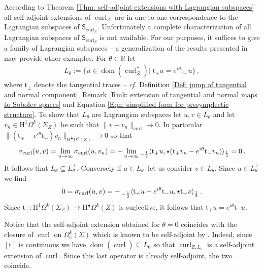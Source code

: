 \begin{Example}
	According to Theorem \ref{Thm: self-adjoint extensions with Lagrangian subspaces} all self-adjoint extensions of $\operatorname{curl}_Z$ are in one-to-one correspondence to the Lagrangian subspaces of $\mathsf{S}_{\operatorname{curl}_Z}$.
	Unfortunately a complete characterization of all Lagrangian subspaces of $\mathsf{S}_{\operatorname{curl}_Z}$ is not available.
	For our purposes, it suffices to give a family of Lagrangian subspaces -- a generalization of the results presented in \parencite{Hiptmair-Kotiuga-Tordeux-12} may provide other examples.
	For $\theta\in\mathbb{R}$ let
	\begin{align}
		L_{\theta}:=\lbrace
		u\in\operatorname{dom}(\operatorname{curl}_Z^*)|\;\mathrm{t}_+u=e^{i\theta}\mathrm{t}_-u\rbrace\,,
	\end{align}
	where $\mathrm{t}_\pm$ denote the tangential traces -- \textit{cf.} Definition \ref{Def: jump of tangential and normal component}, Remark \ref{Rmk: extension of tangential and normal maps to Sobolev spaces} and Equation \eqref{Eqn: simplified form for presymplectic structure}.
	To show that $L_\theta$ are Lagrangian subspaces let $u,v\in L_\theta$ and let $v_n\in\mathrm{H}^1\Omega^k(\Sigma_Z)$ be such that $\|v-v_n\|_{\operatorname{curl}}\to 0$.
	In particular $\|(\mathrm{t}_+-e^{i\theta}\mathrm{t}_-) v_n\|_{\mathrm{H}^{\frac{1}{2}}\Omega^k(Z)}\to 0$ so that
	\begin{align}
		\sigma_{\operatorname{curl}}(u,v)=
		\lim_{n\to \infty}\sigma_{\operatorname{curl}}(u,v_n)=
		-\lim_{n\to \infty}
		\prescript{}{-\frac{1}{2}}{\langle}\mathrm{t}_+u,\star(\mathrm{t}_+v_n-e^{i\theta}\mathrm{t}_-v_n)\rangle_{\frac{1}{2}}=0\,.
	\end{align}
	It follows that $L_\theta\subseteq L_\theta^\perp$.
	Conversely if $u\in L_\theta^\perp$ let us consider $v\in L_\theta$.
	Since $u\in L_\theta^\perp$ we find
	\begin{align*}
		0=\sigma_{\operatorname{curl}}(u,v)=
		-\prescript{}{-\frac{1}{2}}{\langle}\mathrm{t}_+u-e^{i\theta}\mathrm{t}_-u,\star\mathrm{t}_+v\rangle_{\frac{1}{2}}\,.	
	\end{align*}
	Since $\mathrm{t}_+\colon\mathrm{H}^1\Omega^k(\Sigma_Z)\to \mathrm{H}^{\frac12}\Omega^k(Z)$ is surjective, it follows that $\mathrm{t}_+u=e^{i\theta}\mathrm{t}_-u$.

	Notice that the self-adjoint extension obtained for $\theta=0$ coincides with the closure of $\operatorname{curl}$ on $\Omega^k_{\mathrm{c}}(\Sigma)$ which is known to be self-adjoint by \parencite[Lem. 2.6]{Baer-19}.
	Indeed, since $[\mathrm{t}]$ is continuous we have $\operatorname{dom}(\overline{\operatorname{curl}})\subseteq L_{0}$ so that $\operatorname{curl}_{Z,L_0}$ is a self-adjoint extension of $\overline{\operatorname{curl}}$.
	Since this last operator is already self-adjoint, the two coincide.
\end{Example}


